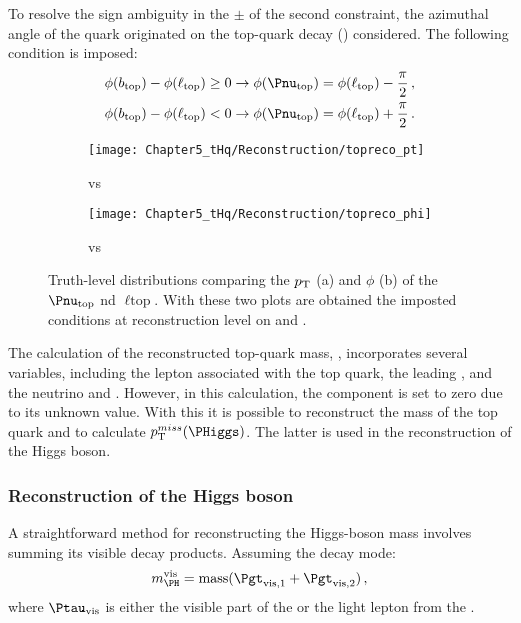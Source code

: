 To resolve the sign ambiguity in the $\pm$ of the second constraint, the azimuthal 
angle of the \Pbottom quark originated on the top-quark decay (\phibtop) considered. 
The following condition is imposed:
\begin{align*}
  \phibtop-\philtop \geq 0 & \rightarrow \phinutop=\philtop-\frac{\pi}{2}\,,\\
  \phibtop-\philtop < 0  & \rightarrow \phinutop=\philtop+\frac{\pi}{2}\, .
\end{align*}


\begin{figure}[h] 
	\begin{subfigure}{0.49\textwidth}
	\texttt{[image: Chapter5\_tHq/Reconstruction/topreco\_pt]}
	\caption{\pnutopT vs \pltopT}
	\label{fig:tHq:EventReconstruction:TopSystem:hypothesis2:pt}
	\end{subfigure}
\hfill 
	\begin{subfigure}{0.49\textwidth}
	\texttt{[image: Chapter5\_tHq/Reconstruction/topreco\_phi]}
	\caption{\phinutop vs \philtop}
	\label{fig:tHq:EventReconstruction:TopSystem:hypothesis2:phi}
	\end{subfigure}
\caption{Truth-level distributions comparing the $p_{\text{T}}$ (a) and $\phi$ (b) of the $\Pnu_{\text{top}}$ nd  $\ell{\text{top}}$.
With these two plots are obtained the imposted conditions at reconstruction level on \pnutopT and \phinutop.} 
\label{fig:tHq:EventReconstruction:TopSystem:Reco}
\end{figure}


The calculation of the reconstructed top-quark mass, \toprecomass, incorporates several 
variables, including the lepton associated with the top quark, the leading \bjet, and the 
neutrino \pnutopT and \phinutop. However, in this calculation, the \pnutopz
component is set to zero due to its unknown value.
With this it is possible to reconstruct the mass of the top quark and
to calculate $\pT^{miss}(\PHiggs)$. The latter is used in the reconstruction
of the Higgs boson. 

\subsubsection{Reconstruction of the Higgs boson}
\label{sec:ChaptH:Sig:EventReconstruction:Higgs}
A straightforward method for reconstructing the Higgs-boson mass involves 
summing its visible decay products. Assuming the \Htautau decay mode:
\begin{equation*}
\Hvismass = \text{mass}(\Pgt_{\text{vis}, 1} + \Pgt_{\text{vis}, 2}) \, ,
\end{equation*}
where $\tauvis$ is either the visible part of the \tauhad
or the light lepton from the \taulep.

